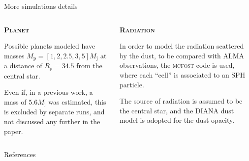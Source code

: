 \documentclass[9pt]{beamer}
\begin{document}
\begin{frame}{More simulations details}
    \begin{columns}
        \begin{column}{0.5\textwidth}
            \indent\textsc{\textbf{\Large Planet}}
            \vspace*{5pt}
                
            Possible planets modeled have masses $M_\text{p} = [1, 2, 2.5, 3,
            5] M_\text{j}$ at a distance of $R_\text{p} = 34.5$ from the
            central star.

            Even if, in a previous work, a mass of $5.6 M_\text{j}$ was
            estimated, this is excluded by separate runs, and not discussed any
            further in the paper.
        \end{column}
        \begin{column}{0.5\textwidth}
            \indent\textsc{\textbf{\Large Radiation}}
            \vspace*{5pt}

            In order to model the radiation scattered by the dust, to be
            compared with ALMA observations, the \textsc{mcfost} code is used,
            where each \enquote{cell} is associated to an SPH particle.

            The source of radiation is assumed to be the central star, and the
            DIANA dust model is adopted for the dust opacity.
        \end{column}
    \end{columns}
\end{frame}


\begin{frame}[allowframebreaks]{References}
  
  
\end{frame}
\end{document}
